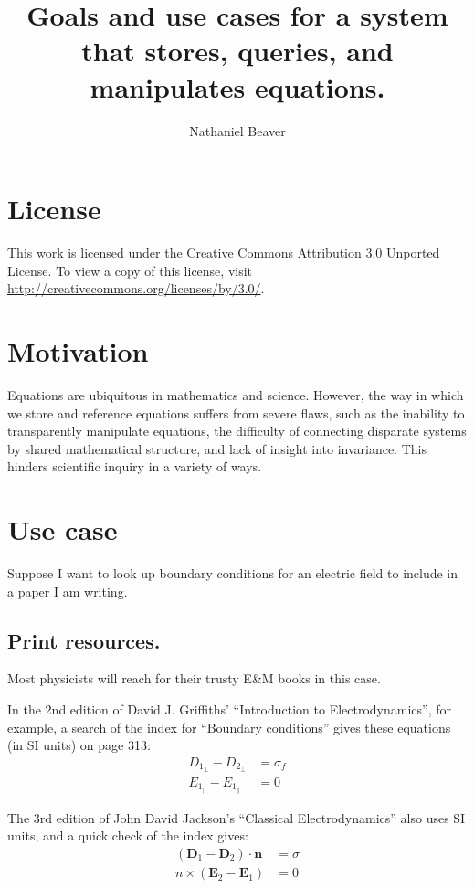\documentclass[12pt,letterpaper]{article}
\author{Nathaniel Beaver}
\title{Goals and use cases for a system that stores, queries, and manipulates equations.}
\begin{document}
\maketitle

\tableofcontents

\section{License}

This work is licensed under the Creative Commons Attribution 3.0 Unported License.
To view a copy of this license, visit \url{http://creativecommons.org/licenses/by/3.0/}.

\section{Motivation}

Equations are ubiquitous in mathematics and science.
However, the way in which we store and reference equations suffers from severe flaws,
such as the inability to transparently manipulate equations,
the difficulty of connecting disparate systems by shared mathematical structure,
and lack of insight into invariance.
This hinders scientific inquiry in a variety of ways.

\section{Use case}

Suppose I want to look up boundary conditions for an electric field to include in a paper I am writing.

\subsection{Print resources.}

Most physicists will reach for their trusty E\&M books in this case.

In the 2nd edition of David J. Griffiths' ``Introduction to Electrodynamics'', for example,
a search of the index for ``Boundary conditions'' gives these equations (in SI units) on page 313:
\begin{align*}
D_{1_\bot} - D_{2_\bot} &= \sigma_f \\
E_{1_\parallel} - E_{1_\parallel} &= 0
\end{align*}

The 3rd edition of John David Jackson's ``Classical Electrodynamics'' also uses SI units,
and a quick check of the index gives:
\begin{align*}
(\mathbf{D}_1 - \mathbf{D}_2)\cdot \mathbf{n} &= \sigma \\
n \times (\mathbf{E}_2 - \mathbf{E}_1) &= 0
\end{align*}
\end{document}
